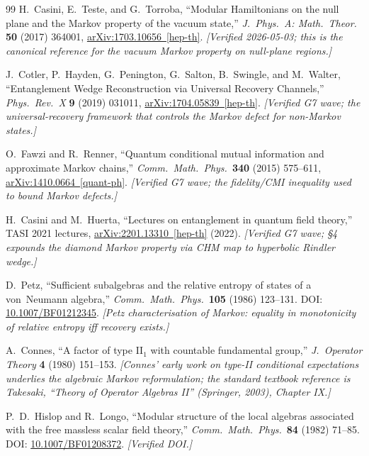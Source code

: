 \documentclass[11pt,a4paper]{article}
\theoremstyle{remark}
\begin{document}
\begin{thebibliography}{99}
H.~Casini, E.~Teste, and G.~Torroba,
``Modular Hamiltonians on the null plane and the Markov property of the
vacuum state,''
\emph{J.\ Phys.\ A: Math.\ Theor.} \textbf{50} (2017) 364001,
\href{https://arxiv.org/abs/1703.10656}{arXiv:1703.10656~[hep-th]}.
\textit{[Verified 2026-05-03; this is the canonical reference for
the vacuum Markov property on null-plane regions.]}

J.~Cotler, P.~Hayden, G.~Penington, G.~Salton, B.~Swingle, and M.~Walter,
``Entanglement Wedge Reconstruction via Universal Recovery Channels,''
\emph{Phys.\ Rev.\ X} \textbf{9} (2019) 031011,
\href{https://arxiv.org/abs/1704.05839}{arXiv:1704.05839~[hep-th]}.
\textit{[Verified G7 wave; the universal-recovery framework that controls
the Markov defect for non-Markov states.]}

O.~Fawzi and R.~Renner,
``Quantum conditional mutual information and approximate Markov chains,''
\emph{Comm.\ Math.\ Phys.}\ \textbf{340} (2015) 575--611,
\href{https://arxiv.org/abs/1410.0664}{arXiv:1410.0664~[quant-ph]}.
\textit{[Verified G7 wave; the fidelity/CMI inequality used to bound
Markov defects.]}

H.~Casini and M.~Huerta,
``Lectures on entanglement in quantum field theory,''
TASI 2021 lectures,
\href{https://arxiv.org/abs/2201.13310}{arXiv:2201.13310~[hep-th]} (2022).
\textit{[Verified G7 wave; \S4 expounds the diamond Markov property
via CHM map to hyperbolic Rindler wedge.]}

D.~Petz,
``Sufficient subalgebras and the relative entropy of states of a
von~Neumann algebra,''
\emph{Comm.\ Math.\ Phys.}\ \textbf{105} (1986) 123--131.
DOI: \href{https://doi.org/10.1007/BF01212345}{10.1007/BF01212345}.
\textit{[Petz characterisation of Markov: equality in monotonicity of
relative entropy iff recovery exists.]}

A.~Connes,
``A factor of type II$_1$ with countable fundamental group,''
\emph{J.\ Operator Theory} \textbf{4} (1980) 151--153.
\textit{[Connes' early work on type-II conditional expectations underlies
the algebraic Markov reformulation; the standard textbook reference is
Takesaki, ``Theory of Operator Algebras II'' (Springer, 2003), Chapter IX.]}

P.~D.~Hislop and R.~Longo,
``Modular structure of the local algebras associated with the free
massless scalar field theory,''
\emph{Comm.\ Math.\ Phys.}\ \textbf{84} (1982) 71--85.
DOI: \href{https://doi.org/10.1007/BF01208372}{10.1007/BF01208372}.
\textit{[Verified DOI.]}


\end{thebibliography}
\end{document}
